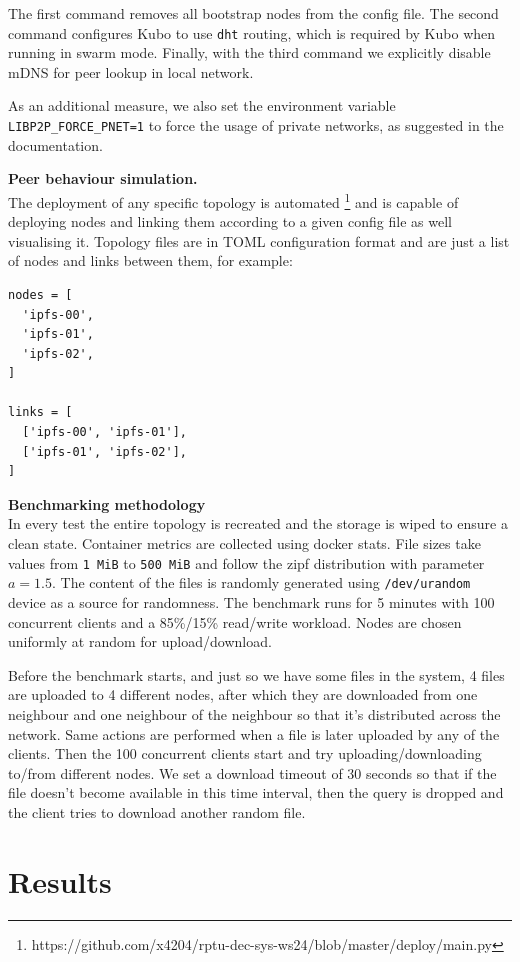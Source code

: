 The first command removes all bootstrap nodes from the config file. The second
command configures Kubo to use \verb|dht| routing, which is required by Kubo
when running in swarm mode. Finally, with the third command we explicitly
disable mDNS for peer lookup in local network.

As an additional measure, we also set the environment variable
\verb|LIBP2P_FORCE_PNET=1| to force the usage of private networks, as suggested
in the documentation.

\textbf{Peer behaviour simulation.}\\
The deployment of any specific topology is automated
\footnote{https://github.com/x4204/rptu-dec-sys-ws24/blob/master/deploy/main.py}
and is capable of deploying nodes and linking them according to a given config
file as well visualising it. Topology files are in TOML configuration format
and are just a list of nodes and links between them, for example:
\begin{lstlisting}
nodes = [
  'ipfs-00',
  'ipfs-01',
  'ipfs-02',
]

links = [
  ['ipfs-00', 'ipfs-01'],
  ['ipfs-01', 'ipfs-02'],
]
\end{lstlisting}

\textbf{Benchmarking methodology}\\
In every test the entire topology is recreated and the storage is wiped to
ensure a clean state. Container metrics are collected using docker stats. File
sizes take values from \verb|1 MiB| to \verb|500 MiB| and follow the zipf
distribution with parameter $a=1.5$. The content of the files is randomly
generated using \verb|/dev/urandom| device as a source for randomness. The
benchmark runs for 5 minutes with 100 concurrent clients and a 85\%/15\%
read/write workload. Nodes are chosen uniformly at random for upload/download.

Before the benchmark starts, and just so we have some files in the system, 4
files are uploaded to 4 different nodes, after which they are downloaded from
one neighbour and one neighbour of the neighbour so that it's distributed
across the network. Same actions are performed when a file is later uploaded by
any of the clients. Then the 100 concurrent clients start and try
uploading/downloading to/from different nodes. We set a download timeout of 30
seconds so that if the file doesn't become available in this time interval,
then the query is dropped and the client tries to download another random file.


\newpage
\section{Results}

